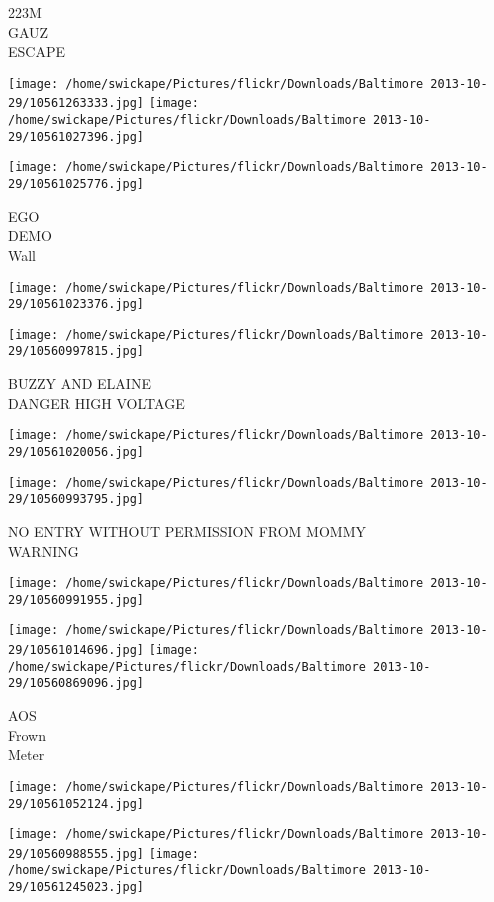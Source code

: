 \documentclass[10pt,letterpaper]{article}
\begin{document}
223M\\
GAUZ\\
ESCAPE
\pagebreak

\texttt{[image: /home/swickape/Pictures/flickr/Downloads/Baltimore 2013-10-29/10561263333.jpg]}
\texttt{[image: /home/swickape/Pictures/flickr/Downloads/Baltimore 2013-10-29/10561027396.jpg]}

\vspace{0.25in}
\texttt{[image: /home/swickape/Pictures/flickr/Downloads/Baltimore 2013-10-29/10561025776.jpg]}

EGO\\
DEMO\\
Wall
\pagebreak

\texttt{[image: /home/swickape/Pictures/flickr/Downloads/Baltimore 2013-10-29/10561023376.jpg]}

\vspace{0.25in}
\texttt{[image: /home/swickape/Pictures/flickr/Downloads/Baltimore 2013-10-29/10560997815.jpg]}

BUZZY AND ELAINE\\
DANGER HIGH VOLTAGE
\pagebreak

\texttt{[image: /home/swickape/Pictures/flickr/Downloads/Baltimore 2013-10-29/10561020056.jpg]}

\vspace{0.25in}
\texttt{[image: /home/swickape/Pictures/flickr/Downloads/Baltimore 2013-10-29/10560993795.jpg]}

NO ENTRY WITHOUT PERMISSION FROM MOMMY\\
WARNING
\pagebreak

\texttt{[image: /home/swickape/Pictures/flickr/Downloads/Baltimore 2013-10-29/10560991955.jpg]}

\vspace{0.25in}
\texttt{[image: /home/swickape/Pictures/flickr/Downloads/Baltimore 2013-10-29/10561014696.jpg]}
\texttt{[image: /home/swickape/Pictures/flickr/Downloads/Baltimore 2013-10-29/10560869096.jpg]}

AOS\\
Frown\\
Meter
\pagebreak

\texttt{[image: /home/swickape/Pictures/flickr/Downloads/Baltimore 2013-10-29/10561052124.jpg]}

\vspace{0.25in}
\texttt{[image: /home/swickape/Pictures/flickr/Downloads/Baltimore 2013-10-29/10560988555.jpg]}
\texttt{[image: /home/swickape/Pictures/flickr/Downloads/Baltimore 2013-10-29/10561245023.jpg]}
\end{document}
